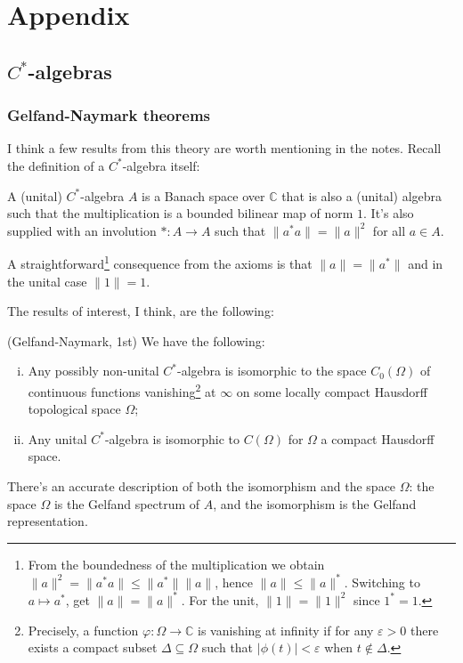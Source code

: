 \section{Appendix}
\subsection{$C^*$-algebras}
\subsubsection{Gelfand-Naymark theorems}
I think a few results from this theory are worth mentioning in the notes. Recall the definition of a $C^*$-algebra itself:
\begin{definition}
A (unital) $C^*$-algebra $A$ is a Banach space over $\mathbb C$ that is also a (unital) algebra such that the multiplication is a bounded bilinear map of norm $1$. It's also supplied with an involution $*:A\rightarrow A$ such that $\|a^*a\| = \|a\|^2$ for all $a \in A$. 
\end{definition}
A straightforward\footnote{From the boundedness of the multiplication we obtain $\|a\|^2 = \|a^*a\| \leq \|a^*\|\|a\|$, hence $\|a\| \leq \|a\|^*$. Switching to $a \mapsto a^*$, get $\|a\| = \|a\|^*$. For the unit, $\|1\| = \|1\|^2$ since $1^* = 1$.} consequence from the axioms is that $\|a\| = \|a^*\|$ and in the unital case $\|1\| = 1$.

The results of interest, I think, are the following:
\begin{theorem}
(Gelfand-Naymark, 1st) We have the following:
\begin{enumerate}[(i)]
\item Any possibly non-unital $C^*$-algebra is isomorphic to the space $C_0(\Omega)$ of continuous functions vanishing\footnote{Precisely, a function $\varphi : \Omega \rightarrow \mathbb C$ is vanishing at infinity if for any $\varepsilon >0$ there exists a compact subset $\Delta \subseteq \Omega$ such that $|\phi(t)|< \varepsilon$ when $t \notin \Delta$.} at $\infty$ on some locally compact Hausdorff topological space $\Omega$;
\item Any unital $C^*$-algebra is isomorphic to $C(\Omega)$ for $\Omega$ a compact Hausdorff space.
\end{enumerate}
\end{theorem}

There's an accurate description of both the isomorphism and the space $\Omega$: the space $\Omega$ is the Gelfand spectrum of $A$, and the isomorphism is the Gelfand representation.

